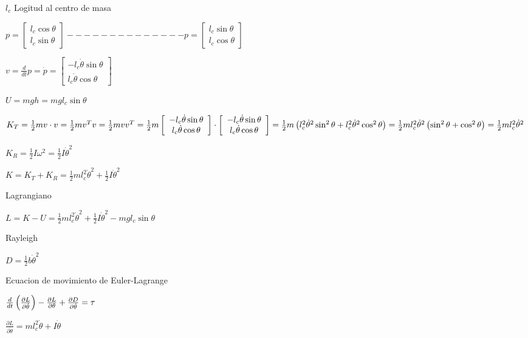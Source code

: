\documentclass{article}
\begin{document}
$l_{c}$ Logitud al centro de masa

$p=\left[ 
\begin{array}{c}
l_{c}\cos \theta  \\ 
l_{c}\sin \theta 
\end{array}%
\right] --------------p=\left[ 
\begin{array}{c}
l_{c}\sin \theta  \\ 
l_{c}\cos \theta 
\end{array}%
\right] $

$v=\frac{d}{dt}p=\dot{p}=\left[ 
\begin{array}{c}
-l_{c}\dot{\theta}\sin \theta  \\ 
l_{c}\dot{\theta}\cos \theta 
\end{array}%
\right] $

$U=mgh=mgl_{c}\sin \theta $

$K_{T}=\frac{1}{2}mv\cdot v=\frac{1}{2}mv^{T}v=\frac{1}{2}mvv^{T}=\frac{1}{2}%
m\left[ 
\begin{array}{c}
-l_{c}\dot{\theta}\sin \theta  \\ 
l_{c}\dot{\theta}\cos \theta 
\end{array}%
\right] \cdot \left[ 
\begin{array}{c}
-l_{c}\dot{\theta}\sin \theta  \\ 
l_{c}\dot{\theta}\cos \theta 
\end{array}%
\right] =\frac{1}{2}m\left( l_{c}^{2}\dot{\theta}^{2}\sin ^{2}\theta
+l_{c}^{2}\dot{\theta}^{2}\cos ^{2}\theta \right) =\frac{1}{2}ml_{c}^{2}\dot{%
\theta}^{2}\left( \sin ^{2}\theta +\cos ^{2}\theta \right) =\frac{1}{2}%
ml_{c}^{2}\dot{\theta}^{2}$

$K_{R}=\frac{1}{2}I\omega ^{2}=\frac{1}{2}I\dot{\theta}^{2}$

$K=K_{T}+K_{R}=\frac{1}{2}ml_{c}^{2}\dot{\theta}^{2}+\frac{1}{2}I\dot{\theta}%
^{2}$

Lagrangiano

$L=K-U=\frac{1}{2}ml_{c}^{2}\dot{\theta}^{2}+\frac{1}{2}I\dot{\theta}%
^{2}-mgl_{c}\sin \theta $

Rayleigh

$D=\frac{1}{2}b\dot{\theta}^{2}$

Ecuacion de movimiento de Euler-Lagrange

$\frac{d}{dt}\left( \frac{\partial L}{\partial \dot{\theta}}\right) -\frac{%
\partial L}{\partial \theta }+\frac{\partial D}{\partial \dot{\theta}}=\tau $

$\frac{\partial L}{\partial \dot{\theta}}=ml_{c}^{2}\dot{\theta}+I\dot{\theta%
}$
\end{document}
